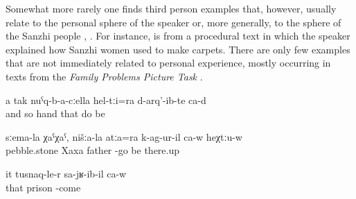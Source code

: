 Somewhat more rarely one finds third person examples that, however, usually relate to the personal sphere of the speaker or, more generally, to the sphere of the Sanzhi people , . For instance,  is from a procedural text in which the speaker explained how Sanzhi women used to make carpets. There are only few examples that are not immediately related to personal experience, mostly occurring in texts from the \textit{Family Problems Picture Task} \citep{SanRoqueEtAl2012} .
%
\begin{exe}
	\ex	\label{ex:And like this with the hands (they) also made them analytic}
	\gll	a	tak	nuˁq-b-a-cːella	hel-tːi=ra	d-arq'-ib-te	ca-d\\
		and	so	hand	that	do 	be\\
	\glt	{}

	\ex	\label{ex:‎Semalla Xaxa (place name). Our father also fell down there}
	\gll	sːema-la	χaˁχaˁ,	nišːa-la	atːa=ra	k-ag-ur-il ca-w	heχtːu-w\\
		pebble.stone	Xaxa		father	-go	be\tsc{-m}	there.up\\
	\glt	{}

	\ex	\label{ex:‎He came back from prison analytic}
	\gll	it	tusnaq-le-r	sa-jʁ-ib-il	ca-w\\
		that	prison	-come \\
	\glt	{}
\end{exe}



